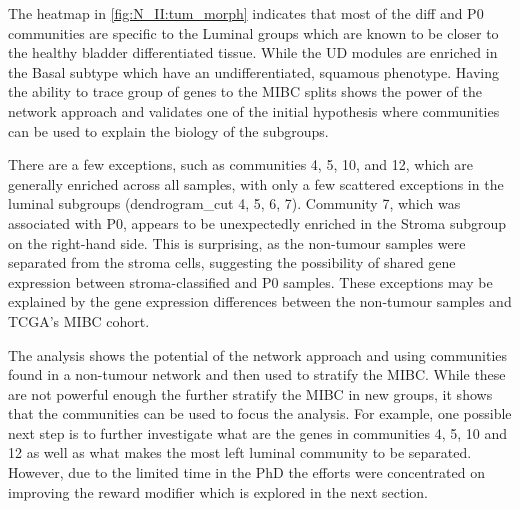 The heatmap in \cref{fig:N_II:tum_morph} indicates that most of the diff and P0 communities are specific to the Luminal groups which are known to be closer to the healthy bladder differentiated tissue. While the UD modules are enriched in the Basal subtype which have an undifferentiated, squamous phenotype. Having the ability to trace group of genes to the MIBC splits shows the power of the network approach and validates one of the initial hypothesis where communities can be used to explain the biology of the subgroups.

There are a few exceptions, such as communities 4, 5, 10, and 12, which are generally enriched across all samples, with only a few scattered exceptions in the luminal subgroups (dendrogram\_cut 4, 5, 6, 7). Community 7, which was associated with P0, appears to be unexpectedly enriched in the Stroma subgroup on the right-hand side. This is surprising, as the non-tumour samples were separated from the stroma cells, suggesting the possibility of shared gene expression between stroma-classified and P0 samples. These exceptions may be explained by the gene expression differences between the non-tumour samples and TCGA's MIBC cohort.

The analysis shows the potential of the network approach and using communities found in a non-tumour network and then used to stratify the MIBC. While these are not powerful enough the further stratify the MIBC in new groups, it shows that the communities can be used to focus the analysis. For example, one possible next step is to further investigate what are the genes in communities 4, 5, 10 and 12 as well as what makes the most left luminal community to be separated. However, due to the limited time in the PhD the efforts were concentrated on improving the reward modifier which is explored in the next section.

